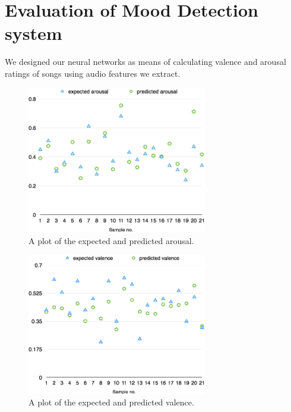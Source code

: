 \section{Evaluation of Mood Detection system}


We designed our neural networks as means of calculating valence and arousal ratings of songs using audio features we extract. 

\begin{figure}[b]
    \includegraphics[width=0.7\textwidth]{Figures/finalarousal}
    \centering

  \caption{A plot of the expected and predicted arousal.}
  \label{fig:finalarousal}
\end{figure}


\begin{figure}[b]
    \vspace{20pt}
    \includegraphics[width=0.7\textwidth]{Figures/finalvalence}
    \centering

  \caption{A plot of the expected and predicted valence.}
  \label{fig:finalvalence}
\end{figure}

